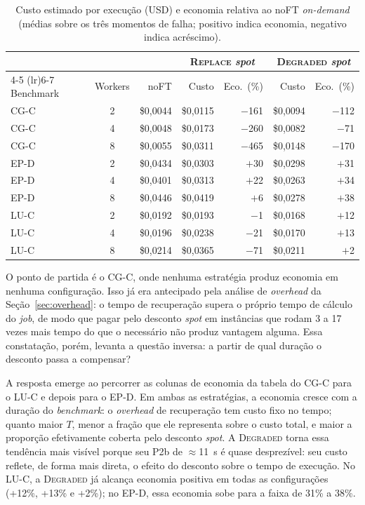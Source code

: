 \begin{table}[htb]
  \caption{Custo estimado por execução (USD) e economia relativa ao noFT
           \textit{on-demand} (médias sobre os três momentos de falha; positivo
           indica economia, negativo indica acréscimo).}
  \label{tab:cost}
  \centering
  \small
  \begin{tabular}{l c r r r r r}
    \toprule
    & & &
      \multicolumn{2}{c}{\textsc{Replace} \textit{spot}} &
      \multicolumn{2}{c}{\textsc{Degraded} \textit{spot}} \\
    \cmidrule(lr){4-5} \cmidrule(lr){6-7}
    Benchmark & Workers & noFT & Custo & Eco.~(\%) & Custo & Eco.~(\%) \\
    \midrule
    CG-C & 2 & \$0,0044 & \$0,0115 & $-$161 & \$0,0094 & $-$112 \\
    CG-C & 4 & \$0,0048 & \$0,0173 & $-$260 & \$0,0082 & $-$71  \\
    CG-C & 8 & \$0,0055 & \$0,0311 & $-$465 & \$0,0148 & $-$170 \\
    \addlinespace
    EP-D & 2 & \$0,0434 & \$0,0303 & $+$30  & \$0,0298 & $+$31  \\
    EP-D & 4 & \$0,0401 & \$0,0313 & $+$22  & \$0,0263 & $+$34  \\
    EP-D & 8 & \$0,0446 & \$0,0419 & $+$6   & \$0,0278 & $+$38  \\
    \addlinespace
    LU-C & 2 & \$0,0192 & \$0,0193 & $-$1   & \$0,0168 & $+$12  \\
    LU-C & 4 & \$0,0196 & \$0,0238 & $-$21  & \$0,0170 & $+$13  \\
    LU-C & 8 & \$0,0214 & \$0,0365 & $-$71  & \$0,0211 & $+$2   \\
    \bottomrule
  \end{tabular}
\end{table}

O ponto de partida é o CG-C, onde nenhuma estratégia produz economia em nenhuma
configuração. Isso já era antecipado pela análise de \textit{overhead} da
Seção~\ref{sec:overhead}: o tempo de recuperação supera o próprio tempo de cálculo
do \textit{job}, de modo que pagar pelo desconto \textit{spot} em instâncias que
rodam 3 a 17 vezes mais tempo do que o necessário não produz vantagem alguma. Essa
constatação, porém, levanta a questão inversa: a partir de qual duração o desconto
passa a compensar?

A resposta emerge ao percorrer as colunas de economia da tabela do CG-C para o LU-C
e depois para o EP-D. Em ambas as estratégias, a economia cresce com a duração do
\textit{benchmark}: o \textit{overhead} de recuperação tem custo fixo no tempo;
quanto maior $T$, menor a fração que ele representa sobre o custo total, e maior a
proporção efetivamente coberta pelo desconto \textit{spot}. A \textsc{Degraded} torna
essa tendência mais visível porque seu P2b de $\approx$11~s é quase desprezível: seu
custo reflete, de forma mais direta, o efeito do desconto sobre o tempo de execução.
No LU-C, a \textsc{Degraded} já alcança economia positiva em todas as configurações
(+12\%, +13\% e +2\%); no EP-D, essa economia sobe para a faixa de 31\% a 38\%.

